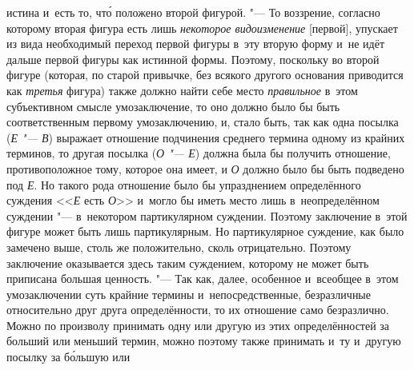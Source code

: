 истина и~есть то, чт\'{о} положено второй фигурой. "--- То
воззрение, согласно которому вторая фигура есть лишь
{\em некоторое видоизменение}
[первой], упускает из вида необходимый переход первой фигуры
в~эту вторую форму и~не идёт дальше первой фигуры как
истинной формы. Поэтому, поскольку во второй фигуре (которая, по старой
привычке, без всякого другого основания приводится как
{\em третья} фигура) также должно найти себе место {\em правильное} в~этом
субъективном смысле умозаключение, то оно должно было бы быть
соответственным первому умозаключению, и, стало быть, так как одна посылка
({\em Е "--- В}) выражает отношение подчинения среднего термина одному из
крайних терминов, то другая посылка ({\em О "--- Е})
должна была бы получить отношение, противоположное тому,
которое она имеет, и {\em О} должно было бы быть подведено под
{\em Е}. Но такого рода отношение было бы упразднением определённого суждения
<<{\em Е} есть {\em О}>> и~могло бы иметь
место лишь в~неопределённом суждении "--- в~некотором
партикулярном суждении. Поэтому заключение в~этой фигуре может быть лишь
партикулярным. Но партикулярное суждение, как было замечено выше, столь же
положительно, сколь отрицательно. Поэтому заключение оказывается здесь
таким суждением, которому не может быть приписана большая ценность. "---
Так как, далее, особенное и~всеобщее в~этом умозаключении
суть крайние термины и~непосредственные, безразличные относительно друг
друга определённости, то их отношение само безразлично. Можно по произволу
принимать одну или другую из этих определённостей за больший или меньший
термин, можно поэтому также принимать и~ту и~другую посылку за б\'{о}льшую или
